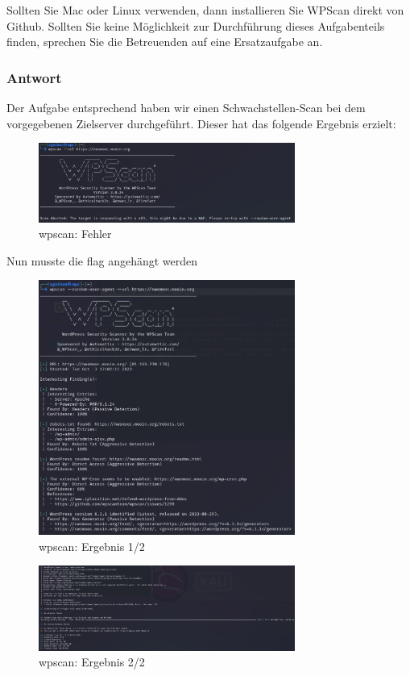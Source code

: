 \documentclass{article}
\begin{document}
Sollten Sie Mac oder Linux verwenden, dann installieren Sie WPScan direkt von Github. 
Sollten Sie keine Möglichkeit zur Durchführung dieses Aufgabenteils finden, sprechen 
Sie die Betreuenden auf eine Ersatzaufgabe an.

\subsubsection*{Antwort}

Der Aufgabe entsprechend haben wir einen Schwachstellen-Scan bei dem vorgegebenen 
Zielserver durchgeführt. Dieser hat das folgende Ergebnis erzielt:

\begin{figure}[H]
	\includegraphics[width=0.75\textwidth]{images/12}
	\centering
	\caption{wpscan: Fehler}
\end{figure}

Nun musste die flag angehängt werden

\begin{figure}[H]
	\includegraphics[width=0.75\textwidth]{images/13}
	\centering
	\caption{wpscan: Ergebnis 1/2}
\end{figure}

\begin{figure}[H]
	\includegraphics[width=0.75\textwidth]{images/14}
	\centering
	\caption{wpscan: Ergebnis 2/2}
\end{figure}
\end{document}
